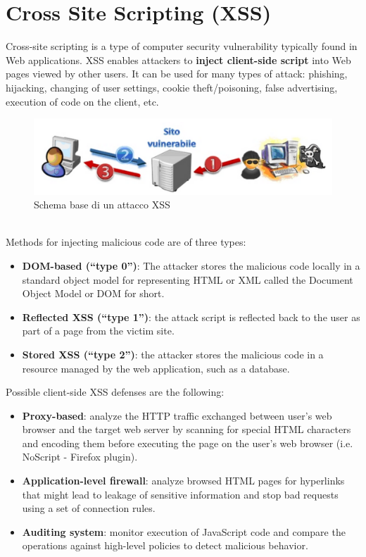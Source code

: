\section{Cross Site Scripting (XSS)}
Cross-site scripting is a type of computer security vulnerability typically found in Web applications. XSS enables attackers to \textbf{inject client-side script} into Web pages viewed by other users. It can be used for many types of attack: phishing, hijacking, changing of user settings, cookie theft/poisoning, false advertising, execution of code on the client, etc. 
\begin{figure}[htbp]
	\centering
	\includegraphics[width=0.5\linewidth]{Immagini/firewalls/XSS.png}
	\caption{Schema base di un attacco XSS} 	
	\label{fig:XSS_attack}
\end{figure}
\\
Methods for injecting malicious code are of three types:
\begin{itemize}
	\item \textbf{DOM-based (“type 0”)}: The attacker stores the malicious code locally in a standard object model for representing HTML or XML called the Document Object Model or DOM for short.
	\item \textbf{Reflected XSS (“type 1”)}: the attack script is reflected back to the user as part of a page from the victim site.
	\item \textbf{Stored XSS (“type 2”)}: the attacker stores the malicious code in a resource managed by the web application, such as a database.
\end{itemize}
Possible client-side XSS defenses are the following:
\begin{itemize}
	\item \textbf{Proxy-based}: analyze the HTTP traffic exchanged between user's web browser and the target web server by scanning for special HTML characters and encoding them before executing the page on the user's web browser (i.e. NoScript -	Firefox plugin).
	\item \textbf{Application-level firewall}: analyze browsed HTML pages for hyperlinks that might lead to leakage of sensitive information and stop bad requests using a set of connection rules.
	\item \textbf{Auditing system}: monitor execution of JavaScript code and compare the operations against high-level policies to detect malicious behavior.
\end{itemize}

